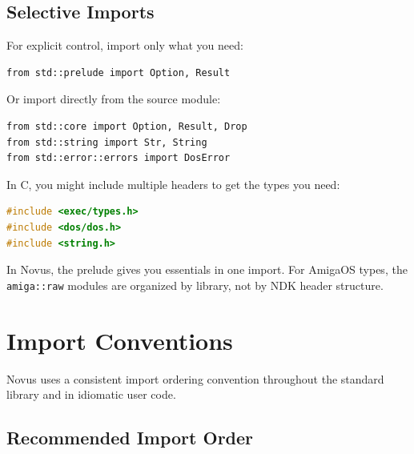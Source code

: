 \subsection{Selective Imports}

For explicit control, import only what you need:

\begin{lstlisting}
from std::prelude import Option, Result
\end{lstlisting}

Or import directly from the source module:

\begin{lstlisting}
from std::core import Option, Result, Drop
from std::string import Str, String
from std::error::errors import DosError
\end{lstlisting}

\begin{comingfromc}
In C, you might include multiple headers to get the types you need:

\begin{lstlisting}[language=C]
#include <exec/types.h>
#include <dos/dos.h>
#include <string.h>
\end{lstlisting}

In Novus, the prelude gives you essentials in one import. For AmigaOS types, the \texttt{amiga::raw} modules are organized by library, not by NDK header structure.
\end{comingfromc}

\section{Import Conventions}
\label{sec:import-conventions}

Novus uses a consistent import ordering convention throughout the standard library and in idiomatic user code.

\subsection{Recommended Import Order}

